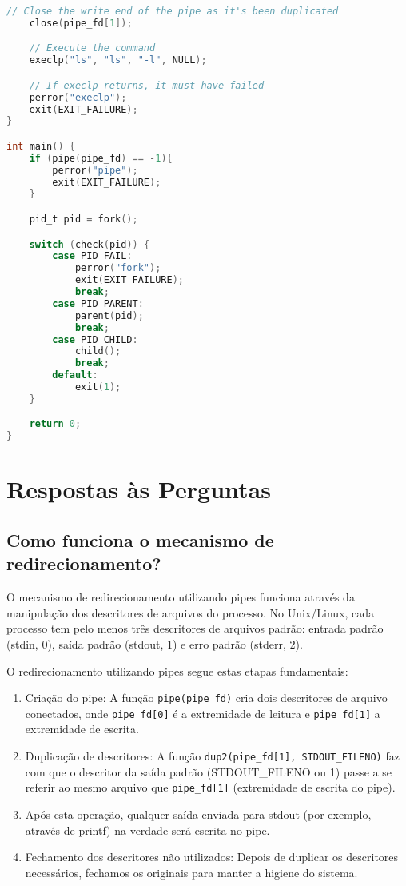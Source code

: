 \documentclass[12pt]{article}
\begin{document}
\begin{lstlisting}[language=C]
    // Close the write end of the pipe as it's been duplicated
    close(pipe_fd[1]);

    // Execute the command
    execlp("ls", "ls", "-l", NULL);

    // If execlp returns, it must have failed
    perror("execlp");
    exit(EXIT_FAILURE);
}

int main() {
    if (pipe(pipe_fd) == -1){
        perror("pipe");
        exit(EXIT_FAILURE);
    }

    pid_t pid = fork();

    switch (check(pid)) {
        case PID_FAIL:
            perror("fork");
            exit(EXIT_FAILURE);
            break;
        case PID_PARENT:
            parent(pid);
            break;
        case PID_CHILD:
            child();
            break;
        default:
            exit(1);
    }

    return 0;
}
\end{lstlisting}

\section{Respostas às Perguntas}

\subsection{Como funciona o mecanismo de redirecionamento?}

O mecanismo de redirecionamento utilizando pipes funciona através da
manipulação dos descritores de arquivos do processo. No Unix/Linux,
cada processo tem pelo menos três descritores de arquivos padrão:
entrada padrão (stdin, 0), saída padrão (stdout, 1) e erro padrão (stderr, 2).

O redirecionamento utilizando pipes segue estas etapas fundamentais:

\begin{enumerate}
    \item Criação do pipe: A função \texttt{pipe(pipe\_fd)} cria dois descritores
    de arquivo conectados, onde \texttt{pipe\_fd[0]} é a extremidade de leitura e
    \texttt{pipe\_fd[1]} a extremidade de escrita.

    \item Duplicação de descritores: A função \texttt{dup2(pipe\_fd[1], STDOUT\_FILENO)} faz com que o descritor da saída padrão (STDOUT\_FILENO ou 1) passe a se referir ao mesmo arquivo que \texttt{pipe\_fd[1]} (extremidade de escrita do pipe).

    \item Após esta operação, qualquer saída enviada para stdout (por exemplo, através de printf) na verdade será escrita no pipe.

    \item Fechamento dos descritores não utilizados: Depois de duplicar os descritores necessários, fechamos os originais para manter a higiene do sistema.
\end{enumerate}
\end{document}
